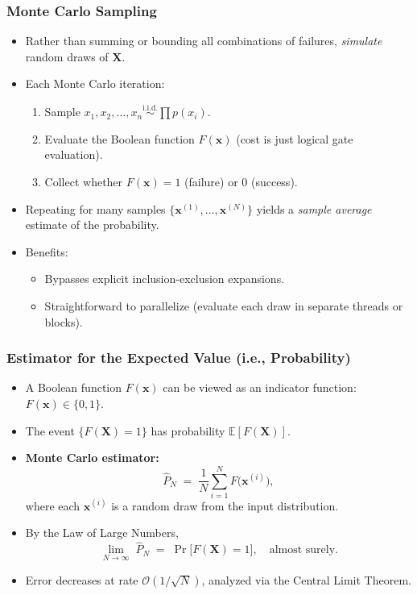 \begin{frame}[t, allowframebreaks]
\frametitle{Monte Carlo Sampling}
\begin{itemize}
  \item Rather than summing or bounding all combinations of failures, \emph{simulate} random draws of \(\mathbf{X}\).
  \item Each Monte Carlo iteration:
    \begin{enumerate}
      \item Sample \(x_1, x_2,\dots,x_n \overset{\text{i.i.d.}}{\sim} \prod p(x_i)\).
      \item Evaluate the Boolean function \(F(\mathbf{x})\) (cost is just logical gate evaluation).
      \item Collect whether \(F(\mathbf{x})=1\) (failure) or 0 (success).
    \end{enumerate}
  \item Repeating for many samples \(\{\mathbf{x}^{(1)}, \dots, \mathbf{x}^{(N)}\}\) yields a \emph{sample average} estimate of the probability.
  \item Benefits:
    \begin{itemize}
      \item Bypasses explicit inclusion-exclusion expansions.
      \item Straightforward to parallelize (evaluate each draw in separate threads or blocks).
    \end{itemize}
\end{itemize}
\end{frame}

\begin{frame}[t, allowframebreaks]
\frametitle{Estimator for the Expected Value (i.e., Probability)}
\begin{itemize}
  \item A Boolean function \(F(\mathbf{x})\) can be viewed as an indicator function: \(F(\mathbf{x}) \in \{0,1\}\).
  \item The event \(\{F(\mathbf{X})=1\}\) has probability \(\mathbb{E}[F(\mathbf{X})]\).
  \item \textbf{Monte Carlo estimator:}
    \[
      \widehat{P}_N
      \;=\;
      \frac{1}{N}\sum_{i=1}^N 
      F\!\bigl(\mathbf{x}^{(i)}\bigr),
    \]
    where each \(\mathbf{x}^{(i)}\) is a random draw from the input distribution.
  \item By the Law of Large Numbers,
    \[
      \lim_{N \to \infty}\;\widehat{P}_N
      \;=\;
      \Pr\bigl[F(\mathbf{X})=1\bigr],
      \quad \text{almost surely}.
    \]
  \item Error decreases at rate \(\mathcal{O}(1/\sqrt{N})\), analyzed via the Central Limit Theorem.
\end{itemize}
\end{frame}

